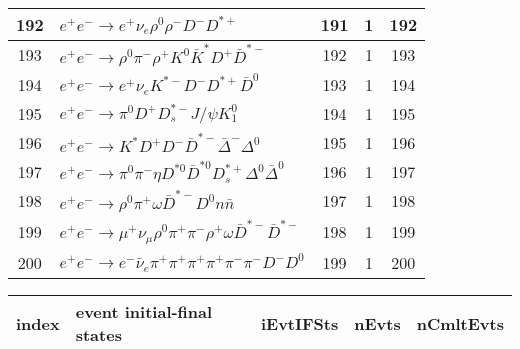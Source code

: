 \documentclass[landscape]{article}
\begin{document}
\begin{table}[htbp!]
\begin{tabular}{|c|>{\centering}p{18cm}|c|c|c|}
\hline
192 & $ e^{+} e^{-} \rightarrow e^{+} \nu_{e} \rho^{0} \rho^{-} D^{-} D^{*+} $ & 191 & 1 & 192 \\
\hline
193 & $ e^{+} e^{-} \rightarrow \rho^{0} \pi^{-} \rho^{+} K^{0} \bar{K}^{*} D^{+} \bar{D}^{*-} $ & 192 & 1 & 193 \\
\hline
194 & $ e^{+} e^{-} \rightarrow e^{+} \nu_{e} K^{*-} D^{-} D^{*+} \bar{D}^{0} $ & 193 & 1 & 194 \\
\hline
195 & $ e^{+} e^{-} \rightarrow \pi^{0} D^{+} D_{s}^{*-} J/\psi K_1^{0} $ & 194 & 1 & 195 \\
\hline
196 & $ e^{+} e^{-} \rightarrow K^{*} D^{+} D^{-} \bar{D}^{*-} \bar{\Delta}^{-} \Delta^{0} $ & 195 & 1 & 196 \\
\hline
197 & $ e^{+} e^{-} \rightarrow \pi^{0} \pi^{-} \eta D^{*0} \bar{D}^{*0} D_{s}^{*+} \Delta^{0} \bar{\Delta}^{0} $ & 196 & 1 & 197 \\
\hline
198 & $ e^{+} e^{-} \rightarrow \rho^{0} \pi^{+} \omega \bar{D}^{*-} D^{0} n \bar{n} $ & 197 & 1 & 198 \\
\hline
199 & $ e^{+} e^{-} \rightarrow \mu^{+} \nu_{\mu} \rho^{0} \pi^{+} \pi^{-} \rho^{+} \omega \bar{D}^{*-} \bar{D}^{*-} $ & 198 & 1 & 199 \\
\hline
200 & $ e^{+} e^{-} \rightarrow e^{-} \bar{\nu}_{e} \pi^{+} \pi^{+} \pi^{+} \pi^{+} \pi^{-} \pi^{-} D^{-} D^{0} $ & 199 & 1 & 200 \\
\hline
\end{tabular}
\end{table}

\clearpage

\begin{table}[htbp!]
\small
\centering
\begin{tabular}{|c|>{\centering}p{18cm}|c|c|c|}
\hline
index & event initial-final states & iEvtIFSts & nEvts & nCmltEvts \\
\hline
\end{tabular}
\end{table}
\end{document}
